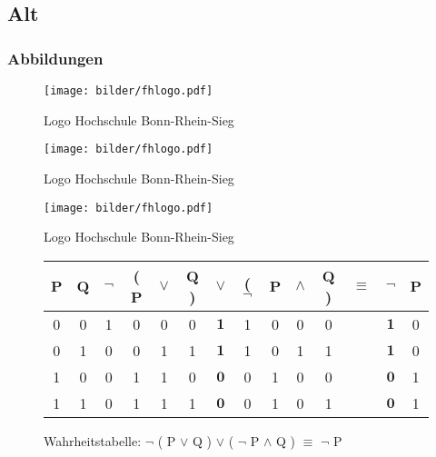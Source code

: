 \subsection{Alt}
\subsubsection{Abbildungen}
\begin{figure}[!ht]
  \begin{center}
    \texttt{[image: bilder/fhlogo.pdf]}
    \caption{Logo Hochschule Bonn-Rhein-Sieg}
    \label{an_tranciver}
  \end{center}
\end{figure}

\begin{figure}[!ht]
  \begin{center}
    \texttt{[image: bilder/fhlogo.pdf]}
    \caption{Logo Hochschule Bonn-Rhein-Sieg}
    \label{an_tranciver}
  \end{center}
\end{figure}

\begin{figure}[!ht]
  \begin{center}
    \texttt{[image: bilder/fhlogo.pdf]}
    \caption{Logo Hochschule Bonn-Rhein-Sieg}
    \label{an_tranciver}
  \end{center}
\end{figure}

\begin{figure}[!ht]
  \begin{center}
    \begin{tabular}{|c|c||c|c|c|c|c|c|c|c|c||c||c|c|}
    \hline
    P & Q & $\neg$ & ( P & $\vee$ & Q ) & $\vee$ & ( $\neg$ & P & $\wedge$ & Q ) & $\equiv$ & $\neg$ & P  \\ \hline \hline
    0 & 0 & 1 & 0 & 0 & 0 & $\mathbf{1}$ & 1 & 0 & 0 & 0 & & $\mathbf{1}$ & 0\\ \hline
    0 & 1 & 0 & 0 & 1 & 1 & $\mathbf{1}$ & 1 & 0 & 1 & 1 & & $\mathbf{1}$ & 0\\ \hline
    1 & 0 & 0 & 1 & 1 & 0 & $\mathbf{0}$ & 0 & 1 & 0 & 0 & & $\mathbf{0}$ & 1\\ \hline
    1 & 1 & 0 & 1 & 1 & 1 & $\mathbf{0}$ & 0 & 1 & 0 & 1 & & $\mathbf{0}$ & 1\\ \hline
    \end{tabular}
    \caption{Wahrheitstabelle: $\neg$ ( P $\vee$ Q ) $\vee$ ( $\neg$ P $\wedge$ Q ) $\equiv$ $\neg$ P}
  \end{center}
\end{figure}

